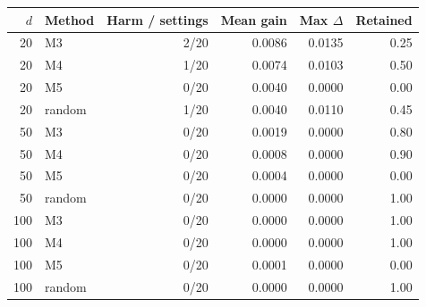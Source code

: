 \begin{tabular}{rlrrrr}
\hline
$d$ & Method & Harm / settings & Mean gain & Max $\Delta$ & Retained \\
\hline
20 & M3 & 2/20 & 0.0086 & 0.0135 & 0.25 \\
20 & M4 & 1/20 & 0.0074 & 0.0103 & 0.50 \\
20 & M5 & 0/20 & 0.0040 & 0.0000 & 0.00 \\
20 & random & 1/20 & 0.0040 & 0.0110 & 0.45 \\
50 & M3 & 0/20 & 0.0019 & 0.0000 & 0.80 \\
50 & M4 & 0/20 & 0.0008 & 0.0000 & 0.90 \\
50 & M5 & 0/20 & 0.0004 & 0.0000 & 0.00 \\
50 & random & 0/20 & 0.0000 & 0.0000 & 1.00 \\
100 & M3 & 0/20 & 0.0000 & 0.0000 & 1.00 \\
100 & M4 & 0/20 & 0.0000 & 0.0000 & 1.00 \\
100 & M5 & 0/20 & 0.0001 & 0.0000 & 0.00 \\
100 & random & 0/20 & 0.0000 & 0.0000 & 1.00 \\
\hline
\end{tabular}
